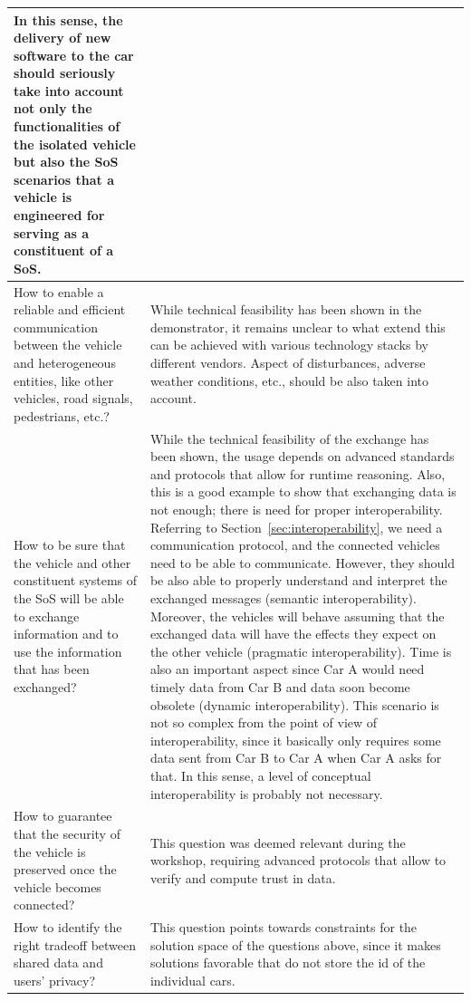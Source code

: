 \begin{longtable}{p{}p{}}
In this sense, the delivery of new software to the car should seriously take into account not only the functionalities of the isolated vehicle but also the SoS scenarios that a vehicle is engineered for serving as a constituent of a SoS.\\
\hline
How to enable a reliable and efficient communication between the vehicle and heterogeneous entities, like other vehicles, road signals, pedestrians, etc.?
& 
While technical feasibility has been shown in the demonstrator, it remains unclear to what extend this can be achieved with various technology stacks by different vendors.
Aspect of disturbances, adverse weather conditions, etc., should be also taken into account.\\
\hline
How to be sure that the vehicle and other constituent systems of the SoS will be able to exchange information and to use the information that has been exchanged?
& 
While the technical feasibility of the exchange has been shown, the usage depends on advanced standards and protocols that allow for runtime reasoning.
Also, this is a good example to show that exchanging data is not enough; there is need for proper interoperability.
Referring to Section~\ref{sec:interoperability}, we need a communication protocol, and the connected vehicles need to be able to communicate.
However, they should be also able to properly understand and interpret the exchanged messages (semantic interoperability).
Moreover, the vehicles will behave assuming that the exchanged data will have the effects they expect on the other vehicle (pragmatic interoperability).
Time is also an important aspect since Car A would need timely data from Car B and data soon become obsolete (dynamic interoperability).
This scenario is not so complex from the point of view of interoperability, since it basically only requires some data sent from Car B to Car A when Car A asks for that.
In this sense, a level of conceptual interoperability is probably not necessary.\\
\hline
How to guarantee that the security of the vehicle is preserved once the vehicle becomes connected?
& 
This question was deemed relevant during the workshop, requiring advanced protocols that allow to verify and compute trust in data.\\
\hline
How to identify the right tradeoff between shared data and users' privacy?
&
This question points towards constraints for the solution space of the questions above, since it makes solutions favorable that do not store the id of the individual cars.\\

\end{longtable}
